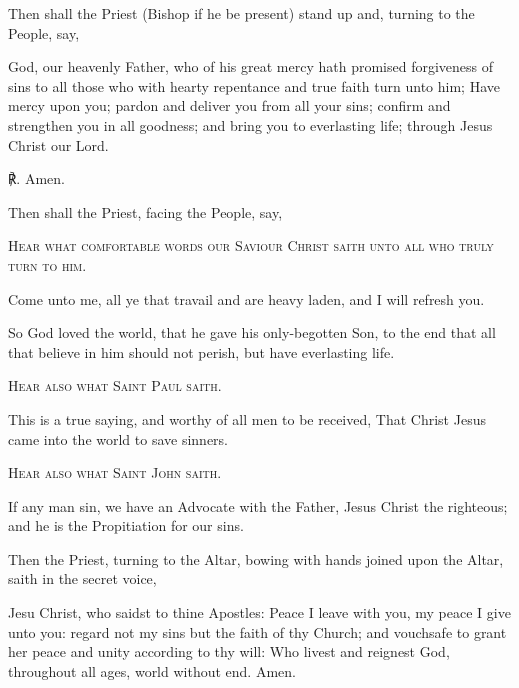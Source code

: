\begin{rubric}
	Then shall the Priest (Bishop if he be present) stand up and, turning to the People, say,
\end{rubric}
 God, our heavenly Father, who of his great mercy hath promised forgiveness of sins to all those who with hearty repentance and true faith turn unto him; Have mercy upon you; pardon {} and deliver you from all your sins; confirm and strengthen you in all goodness; and bring you to everlasting life; through Jesus Christ our Lord.

℟. Amen.
\begin{rubric}
Then shall the Priest, facing the People, say,
\end{rubric}\noindent
\begin{center}
	\textsc{Hear what comfortable words our Saviour Christ saith unto all who truly turn to him.}
\end{center}
\par\noindent
Come unto me, all ye that travail and are heavy laden, and I will refresh you. 
\par\noindent
    So God loved the world, that he gave his only-begotten Son, to the end that all that believe in him should not perish, but have everlasting life. 
    \par\noindent
    \begin{center}
		\textsc{Hear also what Saint Paul saith.}
	\end{center}
\par\noindent
    This is a true saying, and worthy of all men to be received, That Christ Jesus came into the world to save sinners. 
\par\noindent
    \begin{center}
		\textsc{Hear also what Saint John saith.}
	\end{center}
    \par\noindent
    If any man sin, we have an Advocate with the Father, Jesus Christ the righteous; and he is the Propitiation for our sins. 
\begin{rubric}
    Then the Priest, turning to the Altar, bowing with hands joined upon the Altar, saith in the secret voice,
\end{rubric}
     Jesu Christ, who saidst to thine Apostles: Peace I leave with you, my peace I give unto you: regard not my sins but the faith of thy Church; and vouchsafe to grant her peace and unity according to thy will: Who livest and reignest God, throughout all ages, world without end. Amen.
